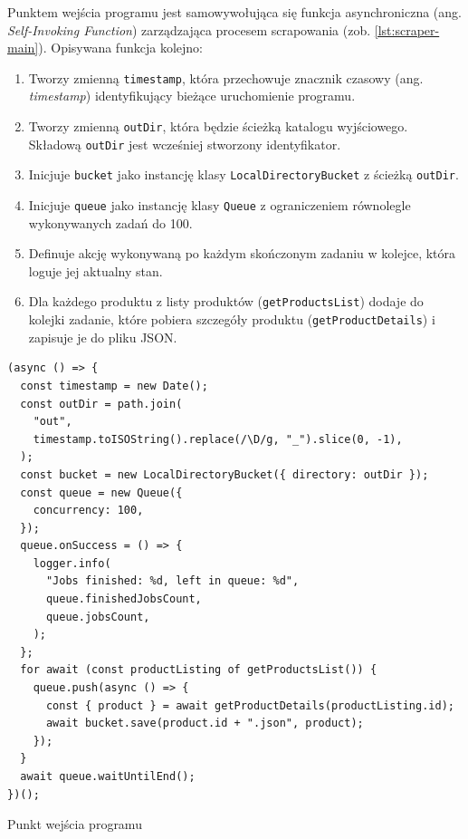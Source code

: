 Punktem wejścia programu jest samowywołująca się funkcja asynchroniczna (ang. \emph{Self-Invoking Function}) zarządzająca procesem scrapowania (zob. \autoref{lst:scraper-main}).
Opisywana funkcja kolejno:

\begin{enumerate}
    \item Tworzy zmienną \texttt{timestamp}, która przechowuje znacznik czasowy (ang. \emph{timestamp}) identyfikujący bieżące uruchomienie programu.
    \item Tworzy zmienną \texttt{outDir}, która będzie ścieżką katalogu wyjściowego.
    Składową \texttt{outDir} jest wcześniej stworzony identyfikator.
    \item Inicjuje \texttt{bucket} jako instancję klasy \texttt{LocalDirectoryBucket} z ścieżką \texttt{outDir}.
    \item Inicjuje \texttt{queue} jako instancję klasy \texttt{Queue} z ograniczeniem równolegle wykonywanych zadań do 100.
    \item Definuje akcję wykonywaną po każdym skończonym zadaniu w kolejce, która loguje jej aktualny stan.
    \item Dla każdego produktu z listy produktów (\texttt{getProductsList}) dodaje do kolejki zadanie, które
    pobiera szczegóły produktu (\texttt{getProductDetails}) i zapisuje je do pliku JSON\@.
\end{enumerate}

\begin{listing}[H]
    \begin{verbatim}
(async () => {
  const timestamp = new Date();
  const outDir = path.join(
    "out",
    timestamp.toISOString().replace(/\D/g, "_").slice(0, -1),
  );
  const bucket = new LocalDirectoryBucket({ directory: outDir });
  const queue = new Queue({
    concurrency: 100,
  });
  queue.onSuccess = () => {
    logger.info(
      "Jobs finished: %d, left in queue: %d",
      queue.finishedJobsCount,
      queue.jobsCount,
    );
  };
  for await (const productListing of getProductsList()) {
    queue.push(async () => {
      const { product } = await getProductDetails(productListing.id);
      await bucket.save(product.id + ".json", product);
    });
  }
  await queue.waitUntilEnd();
})();
    \end{verbatim}
    \caption{Punkt wejścia programu}
    \label{lst:scraper-main}
\end{listing}


